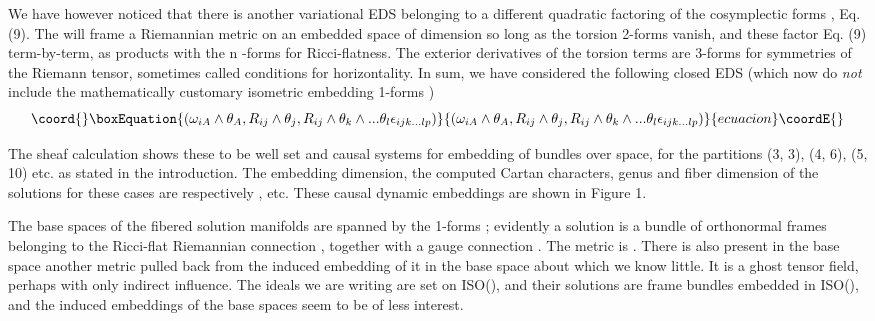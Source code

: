 \documentclass[a4paper,a4paper]{article}
\begin{document}
        We have however noticed that there is another variational EDS
belonging to a different quadratic factoring of the cosymplectic forms
\coordHE{},  Eq. (9).  The \coordHE{} will frame a Riemannian metric on
an embedded space of dimension \coordHE{} so long as the torsion 2-forms
\coordHE{} vanish,  and these factor Eq.
(9) term-by-term,  as products with the n \coordHE{}-forms for
Ricci-flatness. The exterior derivatives of the torsion terms are 3-forms for
symmetries of the Riemann tensor,  sometimes called conditions for
horizontality. In sum,  we have considered the following closed EDS (which now do
{\itshape not} include the mathematically customary isometric embedding
1-forms \coordHE{})
\begin{equation}\coord{}\boxEquation{
({{\omega }_{{iA}}}\wedge {{\theta }_A},  {R_{{ij}}}\wedge {{\theta
}_j}, {R_{{ij}}}\wedge
{{\theta }_k}\wedge ...{{\theta }_l}{{\epsilon }_{{ijk}...{lp}}})
}{
({{\omega }_{{iA}}}\wedge {{\theta }_A},  {R_{{ij}}}\wedge {{\theta
}_j}, {R_{{ij}}}\wedge
{{\theta }_k}\wedge ...{{\theta }_l}{{\epsilon }_{{ijk}...{lp}}})
}{ecuacion}\coordE{}\end{equation}

The sheaf calculation shows these to be  well set and causal systems for
embedding of \coordHE{} bundles over \coordHE{} space,  for the
partitions (3, 3),  (4, 6),  (5, 10) etc. as stated in the introduction.  The
embedding dimension,  the computed Cartan characters,  genus and
\coordHE{} fiber dimension of the solutions for these cases are 
respectively \coordHE{},  etc.  These causal dynamic 
embeddings are shown in Figure 1.

 The base spaces of the fibered solution manifolds are spanned by the
1-forms \coordHE{}; evidently a solution is a bundle of orthonormal
frames belonging to the Ricci-flat Riemannian connection \coordHE{}, together with
a gauge connection \coordHE{}.  The metric is \coordHE{}. There is also present in the base space \coordHE{} 
another metric pulled back from the induced embedding
of it in the base space \coordHE{} about which we know little.   It
is a ghost tensor field,  perhaps with only indirect influence.  The
ideals we are writing are set on ISO(\coordHE{}),  and their solutions are frame
bundles embedded in ISO(\coordHE{}),  and the induced embeddings of the base
spaces seem to be of less interest.
\end{document}
